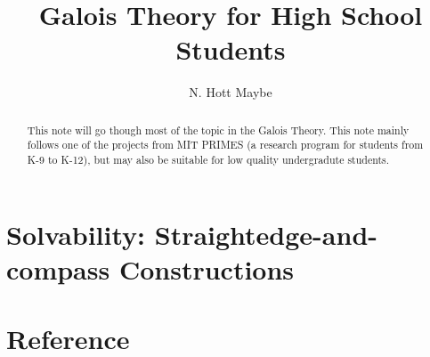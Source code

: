 \documentclass{article}
\title{\textbf{Galois Theory for High School Students}}
\author{N. Hott Maybe}
\theoremstyle{definition}
\begin{document}
    \maketitle
    \begin{abstract}
        This note will go though most of the topic in the Galois Theory. This note mainly follows one of the projects from MIT PRIMES (a research program for students from K-9 to K-12), but may also be suitable for low quality undergradute students.
    \end{abstract}
    \tableofcontents
    \newpage
    
    
    
    
    
    
    \section{Solvability: Straightedge-and-compass Constructions}
    \section{Reference}
\end{document}
